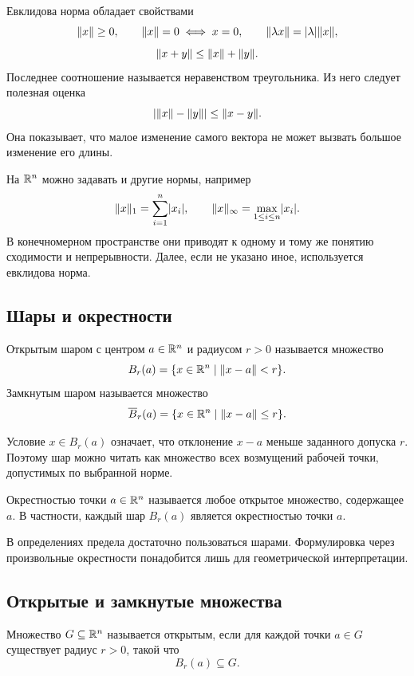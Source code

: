 Евклидова норма обладает свойствами
\[
\lVert x\rVert\geq0,
\qquad
\lVert x\rVert=0\iff x=0,
\qquad
\lVert\lambda x\rVert=\lvert\lambda\rvert\lVert x\rVert,
\]
\[
\lVert x+y\rVert\leq\lVert x\rVert+\lVert y\rVert.
\]
Последнее соотношение называется неравенством треугольника. Из него следует полезная оценка
\[
\lvert\lVert x\rVert-\lVert y\rVert\rvert
\leq
\lVert x-y\rVert.
\]
Она показывает, что малое изменение самого вектора не может вызвать большое изменение его длины.

\begin{remark}
На \(\mathbb{R}^n\) можно задавать и другие нормы, например
\[
\lVert x\rVert_1=\sum_{i=1}^n\lvert x_i\rvert,
\qquad
\lVert x\rVert_{\infty}=\max_{1\leq i\leq n}\lvert x_i\rvert.
\]
В конечномерном пространстве они приводят к одному и тому же понятию сходимости и непрерывности. Далее, если не указано иное, используется евклидова норма.
\end{remark}

\subsection{Шары и окрестности}

\begin{definition}
Открытым шаром с центром \(a\in\mathbb{R}^n\) и радиусом \(r>0\) называется множество
\[
B_r(a)
=
\{x\in\mathbb{R}^n\mid \lVert x-a\rVert<r\}.
\]
Замкнутым шаром называется множество
\[
\overline B_r(a)
=
\{x\in\mathbb{R}^n\mid \lVert x-a\rVert\leq r\}.
\]
\end{definition}

Условие \(x\in B_r(a)\) означает, что отклонение \(x-a\) меньше заданного допуска \(r\). Поэтому шар можно читать как множество всех возмущений рабочей точки, допустимых по выбранной норме.

\begin{definition}
Окрестностью точки \(a\in\mathbb{R}^n\) называется любое открытое множество, содержащее \(a\). В частности, каждый шар \(B_r(a)\) является окрестностью точки \(a\).
\end{definition}

В определениях предела достаточно пользоваться шарами. Формулировка через произвольные окрестности понадобится лишь для геометрической интерпретации.

\subsection{Открытые и замкнутые множества}

\begin{definition}
Множество \(G\subseteq\mathbb{R}^n\) называется открытым, если для каждой точки \(a\in G\) существует радиус \(r>0\), такой что
\[
B_r(a)\subseteq G.
\]
\end{definition}

